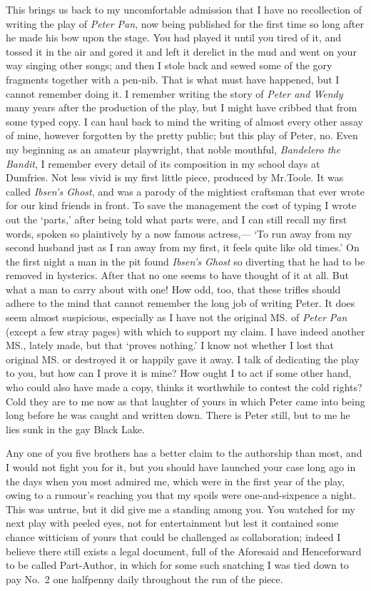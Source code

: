 This brings us back to my uncomfortable admission
that I have no recollection of writing the play of \emph{Peter Pan},
now being published for the first time so long after he made his bow upon the stage.
You had played it until you tired of it,
and tossed it in the air and gored it and left it derelict in the mud
and went on your way singing other songs;
and then I stole back and sewed some of the gory fragments together with a pen-nib.
That is what must have happened, but I cannot remember doing it.
I remember writing the story of \emph{Peter and Wendy} many years after the production of the play,
but I might have cribbed that from some typed copy.
I can haul back to mind the writing of almost every other assay of mine,
however forgotten by the pretty public;
but this play of Peter, no.
Even my beginning as an amateur playwright,
that noble mouthful, \emph{Bandelero the Bandit},
I remember every detail of its composition in my school days at Dumfries.
Not less vivid is my first little piece, produced by Mr.\@ Toole.
It was called \emph{Ibsen’s Ghost},
and was a parody of the mightiest craftsman that ever wrote for our kind friends in front.
To save the management the cost of typing I wrote out the ‘parts,’
after being told what parts were,
and I can still recall my first words, spoken so plaintively by a now famous actress,—%
‘To run away from my second husband just as I ran away from my first,
it feels quite like old times.’
On the first night a man in the pit found \emph{Ibsen’s Ghost} so diverting
that he had to be removed in hysterics.
After that no one seems to have thought of it at all.
But what a man to carry about with one!
How odd, too, that these trifles should adhere to the mind
that cannot remember the long job of writing Peter.
It does seem almost suspicious,
especially as I have not the original MS. of \emph{Peter Pan} (except a few stray pages)
with which to support my claim.
I have indeed another MS., lately made, but that ‘proves nothing.’
I know not whether I lost that original MS. or destroyed it or happily gave it away.
I talk of dedicating the play to you, but how can I prove it is mine?
How ought I to act if some other hand, who could also have made a copy,
thinks it worthwhile to contest the cold rights?
Cold they are to me now as that laughter of yours in which Peter came into being
long before he was caught and written down.
There is Peter still, but to me he lies sunk in the gay Black Lake.

Any one of you five brothers has a better claim to the authorship than most,
and I would not fight you for it,
but you should have launched your case long ago in the days when you most admired me,
which were in the first year of the play,
owing to a rumour’s reaching you that my spoils were one-and-sixpence a night.
This was untrue, but it did give me a standing among you.
You watched for my next play with peeled eyes, not for entertainment
but lest it contained some chance witticism of yours that could be challenged as collaboration;
indeed I believe there still exists a legal document,
full of the Aforesaid and Henceforward to be called Part-Author,
in which for some such snatching I was tied down
to pay No.~2 one halfpenny daily throughout the run of the piece.


